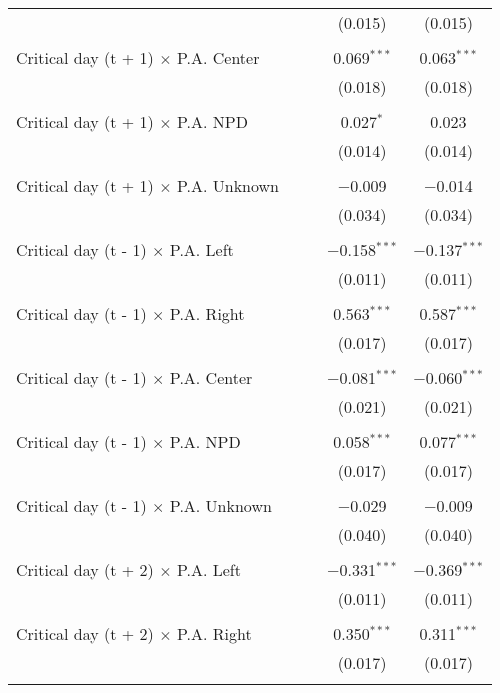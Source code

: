 \documentclass[
]{article}
\begin{document}
\begin{table}[!htbp]
{\begin{tabular}{@{\extracolsep{5pt}}lcccc}
  &  &  & (0.015) & (0.015) \\ 
  & & & & \\ 
 Critical day (t + 1) $\times$ P.A. Center &  &  & 0.069$^{***}$ & 0.063$^{***}$ \\ 
  &  &  & (0.018) & (0.018) \\ 
  & & & & \\ 
 Critical day (t + 1) $\times$ P.A. NPD &  &  & 0.027$^{*}$ & 0.023 \\ 
  &  &  & (0.014) & (0.014) \\ 
  & & & & \\ 
 Critical day (t + 1) $\times$ P.A. Unknown &  &  & $-$0.009 & $-$0.014 \\ 
  &  &  & (0.034) & (0.034) \\ 
  & & & & \\ 
 Critical day (t - 1) $\times$ P.A. Left &  &  & $-$0.158$^{***}$ & $-$0.137$^{***}$ \\ 
  &  &  & (0.011) & (0.011) \\ 
  & & & & \\ 
 Critical day (t - 1) $\times$ P.A. Right &  &  & 0.563$^{***}$ & 0.587$^{***}$ \\ 
  &  &  & (0.017) & (0.017) \\ 
  & & & & \\ 
 Critical day (t - 1) $\times$ P.A. Center &  &  & $-$0.081$^{***}$ & $-$0.060$^{***}$ \\ 
  &  &  & (0.021) & (0.021) \\ 
  & & & & \\ 
 Critical day (t - 1) $\times$ P.A. NPD &  &  & 0.058$^{***}$ & 0.077$^{***}$ \\ 
  &  &  & (0.017) & (0.017) \\ 
  & & & & \\ 
 Critical day (t - 1) $\times$ P.A. Unknown &  &  & $-$0.029 & $-$0.009 \\ 
  &  &  & (0.040) & (0.040) \\ 
  & & & & \\ 
 Critical day (t + 2) $\times$ P.A. Left &  &  & $-$0.331$^{***}$ & $-$0.369$^{***}$ \\ 
  &  &  & (0.011) & (0.011) \\ 
  & & & & \\ 
 Critical day (t + 2) $\times$ P.A. Right &  &  & 0.350$^{***}$ & 0.311$^{***}$ \\ 
  &  &  & (0.017) & (0.017) \\ 
  & & & & \\ 

\end{tabular}}
\end{table}
\end{document}
